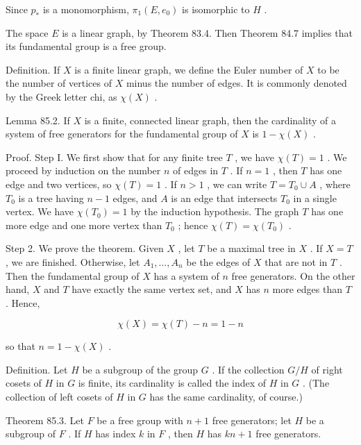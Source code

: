\documentclass[10pt]{article}
\begin{document}
Since \({p}_{ * }\) is a monomorphism, \({\pi }_{1}\left( {E,{e}_{0}}\right)\) is isomorphic to \(H\) .

The space \(E\) is a linear graph, by Theorem 83.4. Then Theorem 84.7 implies that its fundamental group is a free group.

Definition. If \(X\) is a finite linear graph, we define the Euler number of \(X\) to be the number of vertices of \(X\) minus the number of edges. It is commonly denoted by the Greek letter chi, as \(\chi \left( X\right)\) .

Lemma 85.2. If \(X\) is a finite, connected linear graph, then the cardinality of a system of free generators for the fundamental group of \(X\) is \(1 - \chi \left( X\right)\) .

Proof. Step I. We first show that for any finite tree \(T\) , we have \(\chi \left( T\right)  = 1\) . We proceed by induction on the number \(n\) of edges in \(T\) . If \(n = 1\) , then \(T\) has one edge and two vertices, so \(\chi \left( T\right)  = 1\) . If \(n > 1\) , we can write \(T = {T}_{0} \cup  A\) , where \({T}_{0}\) is a tree having \(n - 1\) edges, and \(A\) is an edge that intersects \({T}_{0}\) in a single vertex. We have \(\chi \left( {T}_{0}\right)  = 1\) by the induction hypothesis. The graph \(T\) has one more edge and one more vertex than \({T}_{0}\) ; hence \(\chi \left( T\right)  = \chi \left( {T}_{0}\right)\) .

Step 2. We prove the theorem. Given \(X\) , let \(T\) be a maximal tree in \(X\) . If \(X = T\) , we are finished. Otherwise, let \({A}_{1},\ldots ,{A}_{n}\) be the edges of \(X\) that are not in \(T\) . Then the fundamental group of \(X\) has a system of \(n\) free generators. On the other hand, \(X\) and \(T\) have exactly the same vertex set, and \(X\) has \(n\) more edges than \(T\) . Hence,

\[
\chi \left( X\right)  = \chi \left( T\right)  - n = 1 - n
\]

so that \(n = 1 - \chi \left( X\right)\) .

Definition. Let \(H\) be a subgroup of the group \(G\) . If the collection \(G/H\) of right cosets of \(H\) in \(G\) is finite, its cardinality is called the index of \(H\) in \(G\) . (The collection of left cosets of \(H\) in \(G\) has the same cardinality, of course.)

Theorem 85.3. Let \(F\) be a free group with \(n + 1\) free generators; let \(H\) be a subgroup of \(F\) . If \(H\) has index \(k\) in \(F\) , then \(H\) has \({kn} + 1\) free generators.
\end{document}
